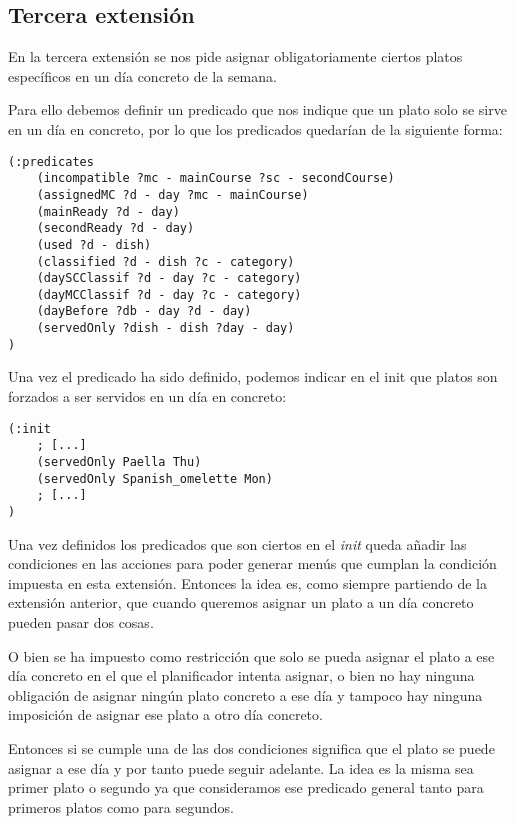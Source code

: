\documentclass{article}
\begin{document}
\subsection{Tercera extensión}
En la tercera extensión se nos pide asignar obligatoriamente ciertos platos específicos en un día concreto de la semana.
\par
Para ello debemos definir un predicado que nos indique que un plato solo se sirve en un día en concreto, por lo que los predicados quedarían de la siguiente forma:
\begin{lstlisting}[language=pddl]
(:predicates
    (incompatible ?mc - mainCourse ?sc - secondCourse)
    (assignedMC ?d - day ?mc - mainCourse)
    (mainReady ?d - day)
    (secondReady ?d - day)
    (used ?d - dish)
    (classified ?d - dish ?c - category)
    (daySCClassif ?d - day ?c - category)
    (dayMCClassif ?d - day ?c - category)
    (dayBefore ?db - day ?d - day)
    (servedOnly ?dish - dish ?day - day)
)
\end{lstlisting}
Una vez el predicado ha sido definido, podemos indicar en el init que platos son forzados a ser servidos en un día en concreto:
\begin{lstlisting}[language=pddl]
(:init
    ; [...]
    (servedOnly Paella Thu)
    (servedOnly Spanish_omelette Mon)
    ; [...]
)
\end{lstlisting}

Una vez definidos los predicados que son ciertos en el \textit{init} queda añadir las condiciones en las acciones para poder generar menús que cumplan la condición impuesta en esta extensión. Entonces la idea es, como siempre partiendo de la extensión anterior, que cuando queremos asignar un plato a un día concreto pueden pasar dos cosas.
\par
O bien se ha impuesto como restricción que solo se pueda asignar el plato a ese día concreto en el que el planificador intenta asignar, o bien no hay ninguna obligación de asignar ningún plato concreto a ese día y tampoco hay ninguna imposición de asignar ese plato a otro día concreto.
\par
Entonces si se cumple una de las dos condiciones significa que el plato se puede asignar a ese día y por tanto puede seguir adelante. La idea es la misma sea primer plato o segundo ya que consideramos ese predicado general tanto para primeros platos como para segundos.
\end{document}
